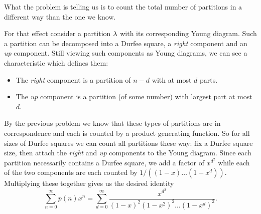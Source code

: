 \documentclass[12pt]{memoir}
\begin{document}
\begin{ptcbr}
What the problem is telling us is to count the total number of partitions in a different way than the one we know.\par 
For that effect consider a partition $\lambda$ with its corresponding Young diagram. Such a partition can be decomposed into a Durfee square, a \emph{right} component and an \emph{up} component. Still viewing such components as Young diagrams, we can see a characteristic which defines them:
\vspace*{-0.4em}
\begin{itemize}
    \itemsep=-0.4em
    \item The \emph{right} component is a partition of $n-d$ with at most $d$ parts.
    \item The \emph{up} component is a partition (of some number) with largest part at most $d$. 
\end{itemize} 
By the previous problem we know that these types of partitions are in correspondence and each is counted by a product generating function. So for all sizes of Durfee squares we can count all partitions these way: fix a Durfee square size, then attach the \emph{right} and \emph{up} components to the Young diagram. Since each partition necessarily contains a Durfee square, we add a factor of $x^{d^2}$ while each of the two components are each counted by $1/((1-x)\dots(1-x^d))$. Multiplying these together gives us 
the desired identity 
$$\sum_{n=0}^\infty p(n)x^n=\sum_{d=0}^\infty \frac{x^{d^2}}{(1-x)^2(1-x^2)^2\dots(1-x^d)^2}.$$
\end{ptcbr}
\end{document}

